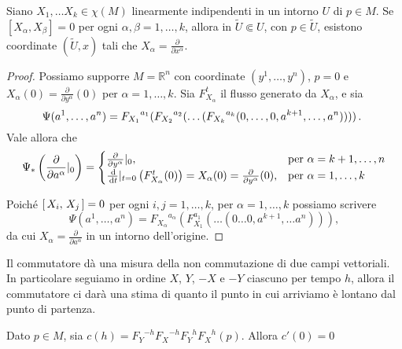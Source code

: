 \begin{proposition}
	Siano $X_1,\dots X_k\in \chi(M)$ linearmente indipendenti in un intorno $U$ di $p\in M$. Se $[X_\alpha,X_\beta]=0$ per ogni $\alpha,\beta=1,\ldots ,k$, allora in $\tilde{U}\Subset U$, con $p\in \tilde{U}$, esistono coordinate $(\tilde{U},x)$ tali che $X_\alpha=\frac{\partial}{\partial x^{\alpha}}$.
\end{proposition}

\begin{proof}
	Possiamo supporre $M=\mathbb{R}^n$ con coordinate $(y^1,\dots, y^n)$, $p=0$ e $X_\alpha(0)=\frac{\partial}{\partial y^\alpha}(0)$ per $\alpha=1,\dots, k$. Sia $F_{X_\alpha}^t$ il flusso generato da $X_\alpha$, e sia 
	\begin{equation*}
		\Psi(a^1,\dots, a^n)={F_{X_1}}^{a_1}({F_{X_2}}^{a_2}(\dots ({F_{X_k}}^{a_k}(0,\dots,0,a^{k+1},\dots, a^n))))\, \text{. } 
	\end{equation*}
	Vale allora che
	\begin{equation*}
		\Psi_*\left(\frac{\partial}{\partial a^\alpha}|_{0}\right) = 
		\begin{cases}
			\frac{\partial}{\partial y^\alpha}|_0, &\text{per $\alpha=k+1,\dots,n$}\\
			\frac{\,\mathrm d}{\,\mathrm d t}|_{t=0}\left(F_{X_\alpha}^t(0)\right) = X_\alpha(0)=\frac{\partial}{\partial y^{\alpha}}(0), &\text{per $\alpha=1,\dots,k$}
		\end{cases}
	\end{equation*}
	
	Poiché $\left[\,X_i,\,X_j\,\right]=0$ per ogni $i,j=1,\dots,k$, per $\alpha=1,\dots, k$ possiamo scrivere
	\begin{equation*}
		\Psi(a^1,\dots,a^n)={F_{X_\alpha}}^{a_\alpha}(F^{a_1}_{X_1}(\dots (0\dots 0, a^{k+1},\dots a^n))),
	\end{equation*}
	da cui $X_{\alpha}=\frac{\partial}{\partial a^{\alpha}}$ in un intorno dell'origine.
\end{proof}

Il commutatore dà una misura della non commutazione di due campi vettoriali. In particolare seguiamo in ordine $X$, $Y$, $-X$ e $-Y$ ciascuno per tempo $h$, allora il commutatore ci darà una stima di quanto il punto in cui arriviamo è lontano dal punto di partenza.

\begin{proposition}
	Dato $p\in M$, sia $c(h)={F_Y}^{-h}{F_X}^{-h}{F_Y}^h{F_X}^h(p)$. Allora $c'(0)=0$
\end{proposition}

